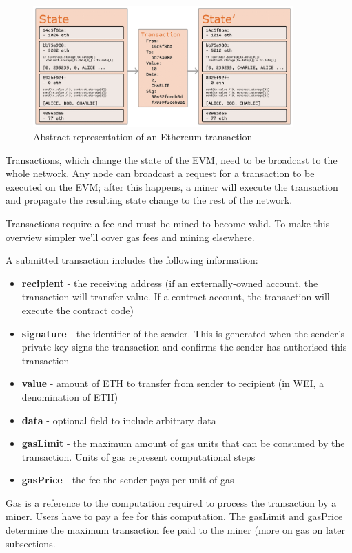 \begin{figure}[H]
	\centering
		\includegraphics[width=10cm]{images/chapter2/transition.png}
		\caption{{\footnotesize Abstract representation of an Ethereum transaction}}
\end{figure}

Transactions, which change the state of the EVM, need to be broadcast to the whole network. Any node can broadcast a request for a transaction to be executed on the EVM; after this happens, a miner will execute the transaction and propagate the resulting state change to the rest of the network.

Transactions require a fee and must be mined to become valid. To make this overview simpler we'll cover gas fees and mining elsewhere.

A submitted transaction includes the following information:

\begin{itemize}
\item \textbf{recipient} - the receiving address (if an externally-owned account, the transaction will transfer value. If a contract account, the transaction will execute the contract code)
\item \textbf{signature} - the identifier of the sender. This is generated when the sender's private key signs the transaction and confirms the sender has authorised this transaction
\item \textbf{value} - amount of ETH to transfer from sender to recipient (in WEI, a denomination of ETH)
\item \textbf{data} - optional field to include arbitrary data
\item \textbf{gasLimit} - the maximum amount of gas units that can be consumed by the transaction. Units of gas represent computational steps
\item \textbf{gasPrice} - the fee the sender pays per unit of gas
\end{itemize}

Gas is a reference to the computation required to process the transaction by a miner. Users have to pay a fee for this computation. The gasLimit and gasPrice determine the maximum transaction fee paid to the miner (more on gas on later subsections.

